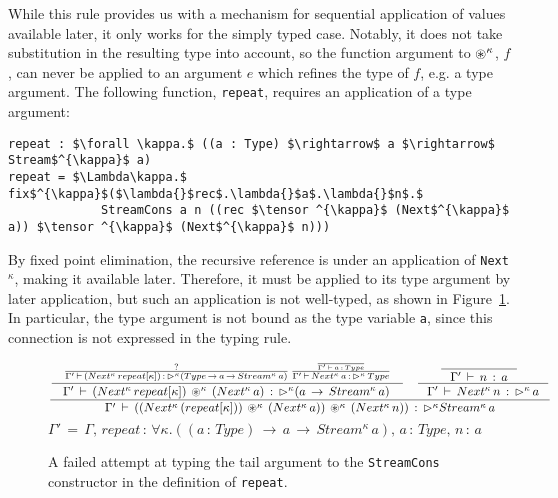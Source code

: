 

While this rule provides us with a mechanism for sequential application of
values available later, it only works for the simply typed case. Notably, it
does not take substitution in the resulting type into account, so the function
argument to $\circledast^\kappa$, $f$, can never be applied to an argument $e$ which
refines the type of $f$, e.g. a type argument. The following function,
\texttt{repeat}, requires an application of a type argument:

\begin{lstlisting}[mathescape]
repeat : $\forall \kappa.$ ((a : Type) $\rightarrow$ a $\rightarrow$ Stream$^{\kappa}$ a)
repeat = $\Lambda\kappa.$ fix$^{\kappa}$($\lambda{}$rec$.\lambda{}$a$.\lambda{}$n$.$ 
             StreamCons a n ((rec $\tensor ^{\kappa}$ (Next$^{\kappa}$ a)) $\tensor ^{\kappa}$ (Next$^{\kappa}$ n)))
\end{lstlisting}

By fixed point elimination, the recursive reference is under an application
of \texttt{Next$^\kappa$}, making it available later. Therefore, it must be
applied to its type argument by later application, but such an application
is not well-typed, as shown in Figure~\ref{fig:repeat_failed_typing}. In
particular, the type argument is not bound as the type variable \texttt{a},
since this connection is not expressed in the typing rule.

\begin{figure}[h]
\centering
\[
\frac { \begin{matrix} \inference { \frac { ? }{ \Gamma '\, \vdash \, (Next^{\kappa}\,repeat[\kappa])\, :\, \later
        ^{\kappa}(Type\, \rightarrow \, a\, \rightarrow \, Stream^{\kappa}\, a) } \, 
      \frac {
        \frac {  }{ \Gamma '\, \vdash \, a\, :\, Type } 
      }
      { \Gamma '\, \vdash \,
        Next^{\kappa}\, a\, :\, \later ^{\kappa}\, Type }
    }{ \, \Gamma '\, \vdash \, (Next^{\kappa}\,repeat[\kappa])\,
      \tensor ^{\kappa} \, (Next^{\kappa}\, a)\, :\, \later ^{\kappa}(a\, \rightarrow \, Stream^{\kappa}\,
      a)\ }  & \inference { \inference {  }{ \Gamma '\, \vdash \, n\, :\, a }  }{
      \Gamma '\, \vdash \, Next^{\kappa}\, n\, :\, \later ^{\kappa} \, a }  \end{matrix} }{
  \Gamma '\, \vdash \, ((Next^{\kappa}\,(repeat[\kappa]))\, \tensor ^{\kappa} \, (Next^{\kappa}\, a))\, \tensor ^{\kappa} \,
  (Next^{\kappa}\, n))\, :\, \later ^{\kappa} Stream^{\kappa}\, a }
\]
\[
\Gamma '\, =\, \Gamma ,\, repeat\, :\, \forall\kappa.((a\, :\, Type)\, \rightarrow \,
a\, \rightarrow \, Stream^{\kappa}\, a),\, a\, :\, Type,\, n\, :\, a
\]
  \caption{A failed attempt at typing the tail argument to the
    \texttt{StreamCons} constructor in the definition of \texttt{repeat}.}
  \label{fig:repeat_failed_typing}
\end{figure}

